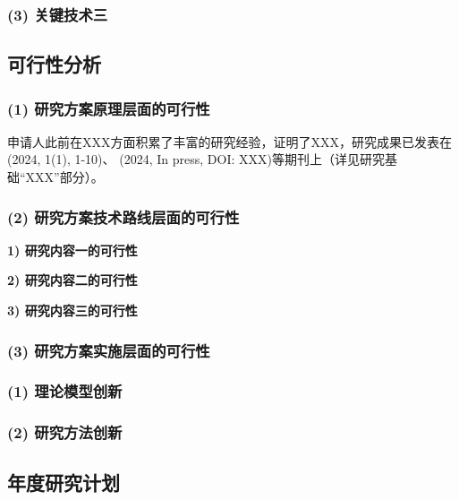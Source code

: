 \documentclass[UTF8,12pt,AutoFakeBold=2]{ctexart}
\begin{document}
\subsubsection*{(3) 关键技术三}

\subsection{可行性分析}

\subsubsection*{(1) 研究方案原理层面的可行性}

申请人此前在XXX方面积累了丰富的研究经验，证明了XXX，研究成果已发表在 (2024, 1(1), 1-10)、 (2024, In press, DOI: XXX)等期刊上（\alert{详见研究基础“XXX”部分}）。

\subsubsection*{(2) 研究方案技术路线层面的可行性}

\textbf{1) 研究内容一的可行性}

\textbf{2) 研究内容二的可行性}

\textbf{3) 研究内容三的可行性}

\subsubsection*{(3) 研究方案实施层面的可行性}


\subsubsection*{(1) 理论模型创新}

\subsubsection*{(2) 研究方法创新}


\subsection{年度研究计划}
\end{document}
